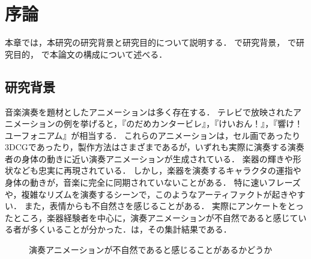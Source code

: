 \chapter{序論}
\label{chap:intro}

本章では，本研究の研究背景と研究目的について説明する．
で研究背景，
で研究目的，
で本論文の構成について述べる．

\section{研究背景}\label{sec:background}
\indent
音楽演奏を題材としたアニメーションは多く存在する．
テレビで放映されたアニメーションの例を挙げると，『のだめカンタービレ』，『けいおん！』，『響け！ユーフォニアム』が相当する．
これらのアニメーションは，セル画であったり3DCGであったり，製作方法はさまざまであるが，いずれも実際に演奏する演奏者の身体の動きに近い演奏アニメーションが生成されている．
楽器の輝きや形状なども忠実に再現されている．
しかし，楽器を演奏するキャラクタの運指や身体の動きが，音楽に完全に同期されていないことがある．
特に速いフレーズや，複雑なリズムを演奏するシーンで，このようなアーティファクトが起きやすい．
また，表情からも不自然さを感じることがある．
実際にアンケートをとったところ，楽器経験者を中心に，演奏アニメーションが不自然であると感じている者が多くいることが分かった．は，その集計結果である．
\begin{figure}[h]
	\centering
	\caption{演奏アニメーションが不自然であると感じることがあるかどうか}
	\label{fig:q1}
\end{figure}
